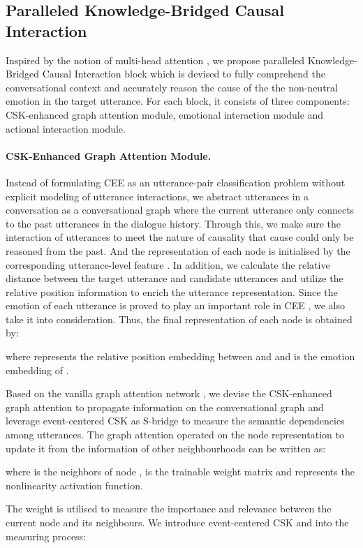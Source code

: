\documentclass[letterpaper]{article} \usepackage{aaai23}  \usepackage{times}  \usepackage{helvet}  \usepackage{courier}  \usepackage[hyphens]{url}  \usepackage{graphicx} \urlstyle{rm} \def\UrlFont{\rm}  \usepackage{natbib}  \usepackage{caption} \frenchspacing  \setlength{\pdfpagewidth}{8.5in} \setlength{\pdfpageheight}{11in} \usepackage{algorithm}
\begin{document}
\subsection{Paralleled Knowledge-Bridged Causal Interaction}
Inspired by the notion of multi-head attention \cite{trans}, we propose paralleled Knowledge-Bridged Causal Interaction block which is devised to fully comprehend the conversational context and accurately reason the cause of the the non-neutral emotion in the target utterance. For each block, it consists of three components: CSK-enhanced graph attention module, emotional interaction module and actional interaction module.

\paragraph{CSK-Enhanced Graph Attention Module.}
Instead of formulating CEE as an utterance-pair classification problem without explicit modeling of utterance interactions, we abstract utterances in a conversation as a conversational graph where the current utterance only connects to the past utterances in the dialogue history. Through this, we make sure the interaction of utterances to meet the nature of causality that cause could only be reasoned from the past. And the representation of each node is initialised by the corresponding utterance-level feature . In addition, we calculate the relative distance between the target utterance and candidate utterances and  utilize the relative position information to enrich the utterance representation. Since the emotion of each utterance is proved to play an important role in CEE \cite{reccon}, we also take it into consideration. Thus, the final representation of each node is obtained by: 

where  represents the relative position embedding between  and  and  is the emotion embedding of .

Based on the vanilla graph attention network \cite{gat}, we devise the CSK-enhanced graph attention to propagate information on the conversational graph and leverage event-centered CSK as S-bridge to measure the semantic dependencies among utterances. The graph attention operated on the node representation to update it from the information of other neighbourhoods can be written as:

where  is the neighbors of node ,  is the trainable weight matrix and  represents the nonlinearity activation function.

The weight  is utilised to measure the importance and relevance between the current node and its neighbours. We introduce event-centered CSK  and  into the measuring process:
\end{document}
